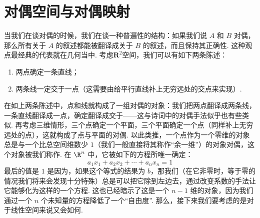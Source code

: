 






\section{对偶空间与对偶映射}

当我们在谈对偶的时候，我们在谈一种普遍性的结构：如果我们说 $A$ 和 $B$ 对偶，那么所有关于 $A$ 的叙述都能被翻译成关于 $B$ 的叙述，而且保持其正确性. 这种观点最经典的代表就在几何当中. 考虑$\mathbf{R}^2$空间，我们可以有如下两条陈述：
\begin{enumerate}
    \item 两点确定一条直线；
    \item 两条线一定交于一点（这需要由给平行直线补上无穷远处的交点来实现）.
\end{enumerate}
在如上两条陈述中，点和线就构成了一组对偶的对象：我们把两点翻译成两条线，一条直线翻译成一点，确定翻译成交于——这与诗词中的对偶手法似乎也有些类似. 再考虑三维情形，三个点确定一个平面，三个平面确定一个点（同样补上无穷远处的点），这就构成了点与平面的对偶. 以此类推，一个点作为一个零维的对象总是与一个比总空间维数少 $1$（我们一般直接将其称作“余一维”）的对象对偶，这个对象被我们称作. 在 $\R^n$ 中，它被如下的方程所唯一确定：
\[a_1 x_1 + a_2 x_2 + \cdots + a_n x_n = 1\]
最后的值是 $1$ 是因为，如果这个等式的结果为 $b$，那我们（在它非零时，等于零的情况我们将来会发现十分特殊）总是可以把它除到左边去，通过改变系数的手法让它能够化为这样的一个方程. 这也已经暗示了这是一个 $n - 1$ 维的对象，因为我们通过一个 $n$ 个未知量的方程降低了一个``自由度''. 那么，接下来我们要考虑的是对于线性空间来说又会如何.

